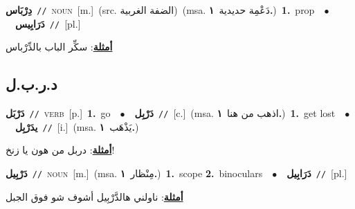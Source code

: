 \documentclass[10pt,a4paper,twoside]{article} %
\begin{document}
\begin{multicols}{2}
{\setlength\topsep{0pt}\textbf{\foreignlanguage{arabic}{دِرْبَاس}}\ {\color{gray}\texttt{//}\color{black}}\ \textsc{noun}\ [m.]\ (src. \color{gray}\foreignlanguage{arabic}{الضفة الغربية}\color{black})\ \color{gray}(msa. \foreignlanguage{arabic}{دَعْمِة حديدية}~\foreignlanguage{arabic}{\textbf{١.}})\color{black}\ \textbf{1.}~prop\ \ $\bullet$\ \ \setlength\topsep{0pt}\textbf{\foreignlanguage{arabic}{دَرَابِيس}}\ {\color{gray}\texttt{//}\color{black}}\ [pl.]\  \begin{flushright}\color{gray}\foreignlanguage{arabic}{\textbf{\underline{\foreignlanguage{arabic}{أمثلة}}}: سكِّر الباب بالدِّرْباس}\end{flushright}\color{black}} \vspace{2mm}

\vspace{-3mm}
\subsection*{\color{blue}\foreignlanguage{arabic}{د.ر.ب.ل}\color{blue}{}} 

{\setlength\topsep{0pt}\textbf{\foreignlanguage{arabic}{دَرْبَل}}\ {\color{gray}\texttt{//}\color{black}}\ \textsc{verb}\ [p.]\ \textbf{1.}~go\ \ $\bullet$\ \ \setlength\topsep{0pt}\textbf{\foreignlanguage{arabic}{دَرْبِل}}\ {\color{gray}\texttt{//}\color{black}}\ [c.]\ \color{gray}(msa. \foreignlanguage{arabic}{اذهب من هنا}~\foreignlanguage{arabic}{\textbf{١.}})\color{black}\ \textbf{1.}~get lost\ \ $\bullet$\ \ \setlength\topsep{0pt}\textbf{\foreignlanguage{arabic}{يدَرْبِل}}\ {\color{gray}\texttt{//}\color{black}}\ [i.]\ \color{gray}(msa. \foreignlanguage{arabic}{يَذْهَب}~\foreignlanguage{arabic}{\textbf{١.}})\color{black}\  \begin{flushright}\color{gray}\foreignlanguage{arabic}{\textbf{\underline{\foreignlanguage{arabic}{أمثلة}}}: دربل من هون يا زنخ!}\end{flushright}\color{black}} \vspace{2mm}

{\setlength\topsep{0pt}\textbf{\foreignlanguage{arabic}{دَرْبِيل}}\ {\color{gray}\texttt{//}\color{black}}\ \textsc{noun}\ [m.]\ \color{gray}(msa. \foreignlanguage{arabic}{مِنْظار}~\foreignlanguage{arabic}{\textbf{١.}})\color{black}\ \textbf{1.}~scope  \textbf{2.}~binoculars\ \ $\bullet$\ \ \setlength\topsep{0pt}\textbf{\foreignlanguage{arabic}{دَرَابِيل}}\ {\color{gray}\texttt{//}\color{black}}\ [pl.]\  \begin{flushright}\color{gray}\foreignlanguage{arabic}{\textbf{\underline{\foreignlanguage{arabic}{أمثلة}}}: ناولني هالدَّرْبِيل أشوف شو فوق الجبل}\end{flushright}\color{black}} \vspace{2mm}


\end{multicols}
\end{document}
